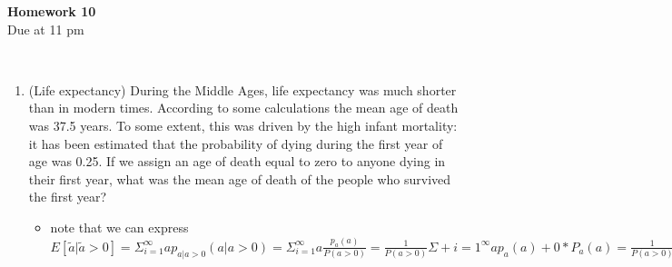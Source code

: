 \documentclass[12pt,twoside]{article}
\begin{document}
\begin{center}
{\large{\textbf{Homework 10}} } \vspace{0.2cm}\\
Due  at 11 pm
\\
\end{center}
\\

\begin{enumerate}

\item (Life expectancy) During the Middle Ages, life expectancy was much shorter than in modern times. According to some calculations the mean age of death was 37.5 years. To some extent, this was driven by the high infant mortality: %
it has been estimated that the probability of dying during the first year of age was 0.25. If we assign an age of death equal to zero to anyone dying in their first year, what was the mean age of death of the people who survived the first year? 

\begin{itemize}
    \item note that we can express $E[\tilde{a}|\tilde{a}>0]=\Sigma_{i=1}^{\infty}ap_{a|a>0}(a|a>0)=\Sigma_{i=1}^{\infty}a\frac{p_{a}(a)}{P(a>0)}=\frac{1}{P(a>0)}\Sigma+{i=1}^{\infty}ap_{a}(a)+0*P_{a}(a)=\frac{1}{P(a>0)}\Sigma+{i=1}^{\infty}ap_{a}(a)=\frac{E(a)}{P(a>0)}=\frac{E(a)}{1-P(a<0)}=\frac{E(a)}{1-P_{a}(0)}=\frac{37.5}{1-.25}=50$
    
\end{itemize}


\end{enumerate}
\end{document}
